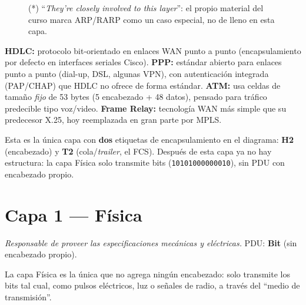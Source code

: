 \documentclass[11pt,a4paper]{article}
\begin{document}
\begin{figure}[h]
\centering
{}
\caption{(*) ``\textit{They're closely involved to this layer}'': el propio material del curso marca ARP/RARP como un caso especial, no de lleno en esta capa.}
\end{figure}

\textbf{HDLC:} protocolo bit-orientado en enlaces WAN punto a punto (encapsulamiento por defecto en interfaces seriales Cisco). \textbf{PPP:} estándar abierto para enlaces punto a punto (dial-up, DSL, algunas VPN), con autenticación integrada (PAP/CHAP) que HDLC no ofrece de forma estándar. \textbf{ATM:} usa celdas de tamaño \emph{fijo} de 53 bytes (5 encabezado + 48 datos), pensado para tráfico predecible tipo voz/video. \textbf{Frame Relay:} tecnología WAN más simple que su predecesor X.25, hoy reemplazada en gran parte por MPLS.

\begin{examfact}
Esta es la única capa con \textbf{dos} etiquetas de encapsulamiento en el diagrama: \textbf{H2} (encabezado) y \textbf{T2} (cola/\textit{trailer}, el FCS). Después de esta capa ya no hay estructura: la capa Física solo transmite bits (\texttt{10101000000010}), sin PDU con encabezado propio.
\end{examfact}

\newpage
\section{Capa 1 --- Física}
\textit{Responsable de proveer las especificaciones mecánicas y eléctricas.} PDU: \textbf{Bit} (sin encabezado propio).

La capa Física es la única que no agrega ningún encabezado: solo transmite los bits tal cual, como pulsos eléctricos, luz o señales de radio, a través del ``medio de transmisión''.
\end{document}
